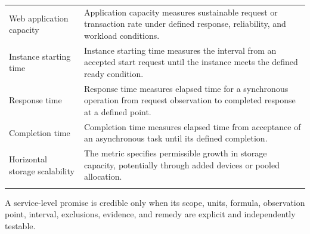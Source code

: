\documentclass[11pt]{article}
\begin{document}
\begin{longtable}{@{}>{\RaggedRight\arraybackslash}p{}>{\RaggedRight\arraybackslash}p{}@{}}
Web application capacity & Application capacity measures sustainable request or transaction rate under defined response, reliability, and workload conditions. \\\addlinespace[2pt]
Instance starting time & Instance starting time measures the interval from an accepted start request until the instance meets the defined ready condition. \\\addlinespace[2pt]
Response time & Response time measures elapsed time for a synchronous operation from request observation to completed response at a defined point. \\\addlinespace[2pt]
Completion time & Completion time measures elapsed time from acceptance of an asynchronous task until its defined completion. \\\addlinespace[2pt]
Horizontal storage scalability & The metric specifies permissible growth in storage capacity, potentially through added devices or pooled allocation. \\\addlinespace[2pt]
\bottomrule
\end{longtable}
\begin{takeawaybox}
A service-level promise is credible only when its scope, units, formula, observation point, interval, exclusions, evidence, and remedy are explicit and independently testable.
\end{takeawaybox}
\end{document}
